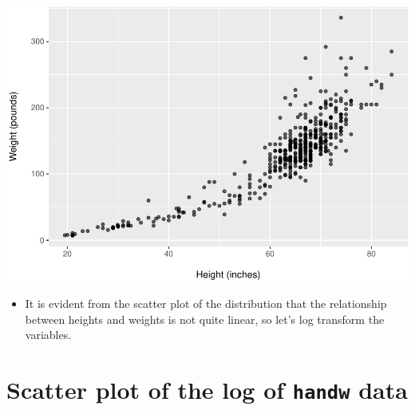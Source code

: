 \documentclass[
]{article}
\providecommand{\tightlist}{%
  \setlength{\itemsep}{0pt}\setlength{\parskip}{0pt}}
\begin{document}
\includegraphics{L6_Correlation_and_regresion_simulation_pdf_files/figure-latex/plot handw-1.pdf}

\begin{itemize}
\tightlist
\item
  It is evident from the scatter plot of the distribution that the
  relationship between heights and weights is not quite linear, so let's
  log transform the variables.
\end{itemize}

\hypertarget{scatter-plot-of-the-log-of-handw-data}{%
\section{\texorpdfstring{Scatter plot of the log of \texttt{handw}
data}{Scatter plot of the log of handw data}}\label{scatter-plot-of-the-log-of-handw-data}}
\end{document}
